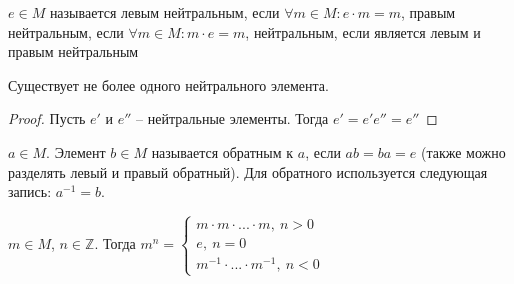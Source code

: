 \begin{conj}
    $e \in M$ называется левым нейтральным, если $\forall m \in M: e\cdot m = m$, правым нейтральным, если $\forall m \in M: m\cdot e = m$, нейтральным, если является левым и правым нейтральным
\end{conj}
\begin{theorem-non}
    Существует не более одного нейтрального элемента.
\end{theorem-non}
\begin{proof}
    Пусть $e'$ и $e''$ -- нейтральные элементы.
    Тогда $e' = e'e'' = e''$
\end{proof}
\begin{conj}
    $a \in M$. Элемент $b \in M$ называется обратным к $a$, если $ab = ba = e$ (также можно разделять левый и правый обратный).
    Для обратного используется следующая запись: $a^{-1} = b$.
\end{conj}
\begin{conj}
    $m \in M$, $n \in \mathbb{Z}$. Тогда
    $m^n = \begin{cases}
    m\cdot m\cdot ...\cdot m,\ n>0\\
    e,\ n=0\\
    m^{-1}\cdot ... \cdot m^{-1},\ n<0
    \end{cases}$
\end{conj}